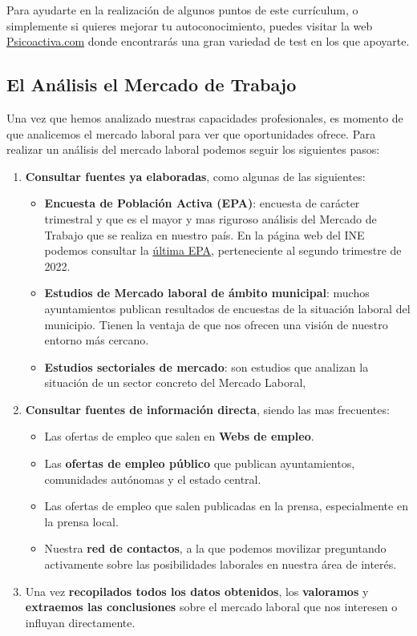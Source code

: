 Para ayudarte en la realización de algunos puntos de este currículum, o simplemente si quieres mejorar tu autoconocimiento, puedes visitar la web \href{https://www.psicoactiva.com/test/diagnosticos/}{Psicoactiva.com} donde encontrarás una gran variedad de test en los que apoyarte.

\subsection{El Análisis el Mercado de Trabajo}
Una vez que hemos analizado nuestras capacidades profesionales, es momento de que analicemos el mercado laboral para ver que oportunidades ofrece. Para realizar un análisis del mercado laboral podemos seguir los siguientes pasos:

\begin{enumerate}
    \item \textbf{Consultar fuentes ya elaboradas}, como algunas de las siguientes:
    \begin{itemize}
        \item \textbf{Encuesta de Población Activa (EPA)}: encuesta de carácter trimestral y que es el mayor y mas riguroso análisis del Mercado de Trabajo que se realiza en nuestro país. En la página web del INE podemos consultar la \href{https://www.ine.es/dyngs/INEbase/es/operacion.htm?c=Estadistica_C&cid=1254736176918&menu=ultiDatos&idp=1254735976595}{última EPA}, perteneciente al segundo trimestre de 2022.
        \item \textbf{Estudios de Mercado laboral de ámbito municipal}: muchos ayuntamientos publican resultados de encuestas de la situación laboral del municipio. Tienen la ventaja de que nos ofrecen una visión de nuestro entorno más cercano.
        \item \textbf{Estudios sectoriales de mercado}: son estudios que analizan la situación de un sector concreto del Mercado Laboral,
    \end{itemize}
    \item \textbf{Consultar fuentes de información directa}, siendo las mas frecuentes:
    \begin{itemize}
        \item Las ofertas de empleo que salen en \textbf{Webs de empleo}.
        \item Las \textbf{ofertas de empleo público} que publican ayuntamientos, comunidades autónomas y el estado central.
        \item Las ofertas de empleo que salen publicadas en la prensa, especialmente en la prensa local.
        \item Nuestra \textbf{red de contactos}, a la que podemos movilizar preguntando activamente sobre las posibilidades laborales en nuestra área de interés.
    \end{itemize}
    \item Una vez \textbf{recopilados todos los datos obtenidos}, los \textbf{valoramos} y \textbf{extraemos las conclusiones} sobre el mercado laboral que nos interesen o influyan directamente.
\end{enumerate}

